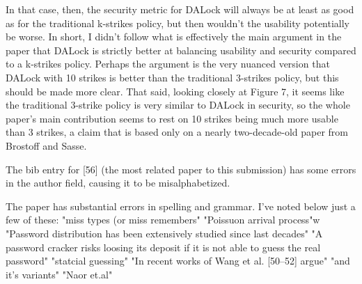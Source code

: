 In that case, then, the security metric for DALock will always be at least as good as for the traditional k-strikes policy, but then wouldn't the usability potentially be worse. In short, I didn't follow what is effectively the main argument in the paper that DALock is strictly better at balancing usability and security compared to a k-strikes policy. Perhaps the argument is the very nuanced version that DALock with 10 strikes is better than the traditional 3-strikes policy, but this should be made more clear. That said, looking closely at Figure 7, it seems like the traditional 3-strike policy is very similar to DALock in security, so the whole paper's main contribution seems to rest on 10 strikes being much more usable than 3 strikes, a claim that is based only on a nearly two-decade-old paper from Brostoff and Sasse.

The bib entry for [56] (the most related paper to this submission) has some errors in the author field, causing it to be misalphabetized.

The paper has substantial errors in spelling and grammar. I've noted below just a few of these:
"miss types (or miss remembers"
"Poissuon arrival process"w
"Password distribution has been extensively studied since last decades"
"A password cracker risks loosing its deposit if it is not able to guess the real password"
"statcial guessing"
"In recent works of Wang et al. [50–52] argue"
"and it’s variants"
"Naor et.al"

